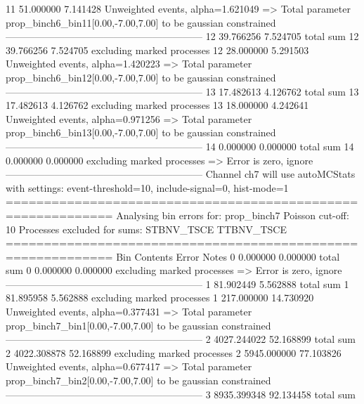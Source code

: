 11         51.000000       7.141428        Unweighted events, alpha=1.621049
  => Total parameter prop_binch6_bin11[0.00,-7.00,7.00] to be gaussian constrained
------------------------------------------------------------
12         39.766256       7.524705        total sum                     
12         39.766256       7.524705        excluding marked processes    
12         28.000000       5.291503        Unweighted events, alpha=1.420223
  => Total parameter prop_binch6_bin12[0.00,-7.00,7.00] to be gaussian constrained
------------------------------------------------------------
13         17.482613       4.126762        total sum                     
13         17.482613       4.126762        excluding marked processes    
13         18.000000       4.242641        Unweighted events, alpha=0.971256
  => Total parameter prop_binch6_bin13[0.00,-7.00,7.00] to be gaussian constrained
------------------------------------------------------------
14         0.000000        0.000000        total sum                     
14         0.000000        0.000000        excluding marked processes    
  => Error is zero, ignore      
------------------------------------------------------------
Channel ch7 will use autoMCStats with settings: event-threshold=10, include-signal=0, hist-mode=1
============================================================
Analysing bin errors for: prop_binch7
Poisson cut-off: 10
Processes excluded for sums: STBNV_TSCE TTBNV_TSCE
============================================================
Bin        Contents        Error           Notes                         
0          0.000000        0.000000        total sum                     
0          0.000000        0.000000        excluding marked processes    
  => Error is zero, ignore      
------------------------------------------------------------
1          81.902449       5.562888        total sum                     
1          81.895958       5.562888        excluding marked processes    
1          217.000000      14.730920       Unweighted events, alpha=0.377431
  => Total parameter prop_binch7_bin1[0.00,-7.00,7.00] to be gaussian constrained
------------------------------------------------------------
2          4027.244022     52.168899       total sum                     
2          4022.308878     52.168899       excluding marked processes    
2          5945.000000     77.103826       Unweighted events, alpha=0.677417
  => Total parameter prop_binch7_bin2[0.00,-7.00,7.00] to be gaussian constrained
------------------------------------------------------------
3          8935.399348     92.134458       total sum                     
